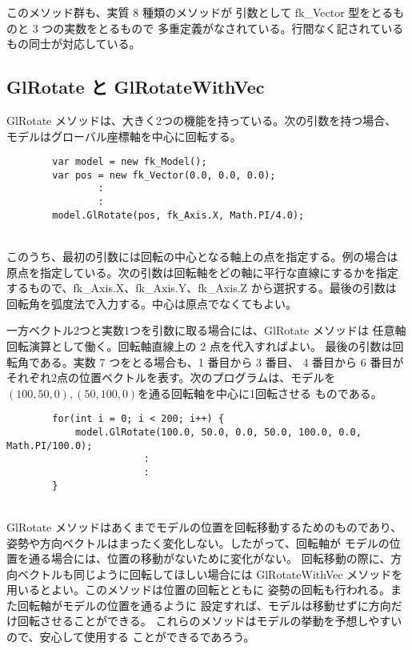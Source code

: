 このメソッド群も、実質 8 種類のメソッドが
引数として fk\_Vector 型をとるものと 3 つの実数をとるもので
多重定義がなされている。行間なく記されているもの同士が対応している。

\subsection{GlRotate と GlRotateWithVec}
GlRotate メソッドは、大きく2つの機能を持っている。次の引数を持つ場合、
モデルはグローバル座標軸を中心に回転する。
\\
\begin{breakbox}
\begin{verbatim}
        var model = new fk_Model();
        var pos = new fk_Vector(0.0, 0.0, 0.0);
                :
                :
        model.GlRotate(pos, fk_Axis.X, Math.PI/4.0);
\end{verbatim}
\end{breakbox}
~ \\
このうち、最初の引数には回転の中心となる軸上の点を指定する。例の場合は
原点を指定している。次の引数は回転軸をどの軸に平行な直線にするかを指定
するもので、fk\_Axis.X、fk\_Axis.Y、fk\_Axis.Z から選択する。最後の引数は
回転角を弧度法で入力する。中心は原点でなくてもよい。

一方ベクトル2つと実数1つを引数に取る場合には、GlRotate メソッドは
任意軸回転演算として働く。回転軸直線上の 2 点を代入すればよい。
最後の引数は回転角である。実数 7 つをとる場合も、1 番目から 3 番目、
4 番目から 6 番目がそれぞれ2点の位置ベクトルを表す。次のプログラムは、モデルを
\((100, 50, 0), (50, 100, 0)\)を通る回転軸を中心に1回転させる
ものである。
\\
\begin{breakbox}
\begin{verbatim}
        for(int i = 0; i < 200; i++) {
            model.GlRotate(100.0, 50.0, 0.0, 50.0, 100.0, 0.0, Math.PI/100.0);
                        :
                        :
        }
\end{verbatim}
\end{breakbox}
~ \\
GlRotate メソッドはあくまでモデルの位置を回転移動するためのものであり、
姿勢や方向ベクトルはまったく変化しない。したがって、回転軸が
モデルの位置を通る場合には、位置の移動がないために変化がない。
回転移動の際に、方向ベクトルも同じように回転してほしい場合には
GlRotateWithVec メソッドを用いるとよい。このメソッドは位置の回転とともに
姿勢の回転も行われる。また回転軸がモデルの位置を通るように
設定すれば、モデルは移動せずに方向だけ回転させることができる。
これらのメソッドはモデルの挙動を予想しやすいので、安心して使用する
ことができるであろう。


